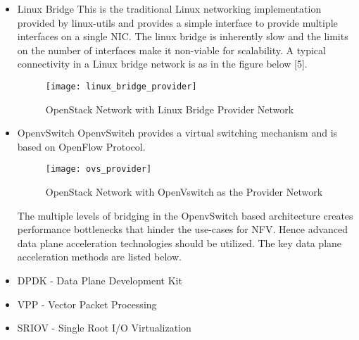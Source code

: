 \begin{enumerate}
    \begin{itemize}
        \item Linux Bridge
            This is the traditional Linux networking implementation provided by linux-utils and provides a simple interface to provide multiple interfaces on a single NIC\@. The linux bridge is inherently slow and the limits on the number of interfaces make it non-viable for scalability. A typical connectivity in a Linux bridge network is as in the figure below [5].
            \begin{figure}[h!]
		        \centering
  		        \texttt{[image: linux\_bridge\_provider]}
  		        \label{fig:figure12}
		        \caption{OpenStack Network with Linux Bridge Provider Network}
	        \end{figure}
        \item OpenvSwitch
            OpenvSwitch provides a virtual switching mechanism and is based on OpenFlow Protocol. 
            \begin{figure}[h!]
		        \centering
                \texttt{[image: ovs\_provider]}
		        \label{fig:16}
		        \caption{OpenStack Network with OpenVswitch as the Provider Network}
	        \end{figure}
            The multiple levels of bridging in the OpenvSwitch based architecture creates performance bottlenecks that hinder the use-cases for NFV\@. Hence advanced data plane acceleration technologies should be utilized. The key data plane acceleration methods are listed below.
	
        \item DPDK - Data Plane Development Kit
	    \item VPP - Vector Packet Processing
	    \item SRIOV - Single Root I/O Virtualization
    \end{itemize}			
\end{enumerate}
